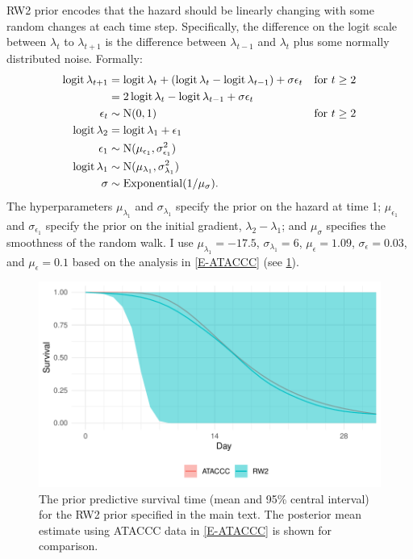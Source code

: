 \documentclass[thesis.tex]{subfiles}
\begin{document}
RW2 prior encodes that the hazard should be linearly changing with some random changes at each time step.
Specifically, the difference on the logit scale between $\lambda_t$ to $\lambda_{t+1}$ is the difference between $\lambda_{t-1}$ and $\lambda_t$ plus some normally distributed noise.
Formally:
\begin{align}
  \operatorname{logit}\lambda_{t+1}
  &= \operatorname{logit}\lambda_t + (\operatorname{logit}\lambda_t - \operatorname{logit}\lambda_{t-1}) + \sigma \epsilon_t &\text{for $t \geq 2$} \\
  &= 2\operatorname{logit}\lambda_t - \operatorname{logit}\lambda_{t-1} + \sigma \epsilon_t \\
  \epsilon_t &\sim \operatorname{N}(0, 1) &\text{for $t \geq 2$}  \\
  \operatorname{logit}\lambda_2 &= \operatorname{logit}\lambda_1 + \epsilon_1 \\\
  \epsilon_1 &\sim \operatorname{N}(\mu_{\epsilon_1}, \sigma_{\epsilon_1}^2) \\
  \operatorname{logit} \lambda_1 &\sim \operatorname{N}(\mu_{\lambda_1}, \sigma_{\lambda_1}^2) \\
  \sigma &\sim \operatorname{Exponential}(1/\mu_\sigma).
\end{align}
The hyperparameters $\mu_{\lambda_1}$ and $\sigma_{\lambda_1}$ specify the prior on the hazard at time 1; $\mu_{\epsilon_1}$ and $\sigma_{\epsilon_1}$ specify the prior on the initial gradient, $\lambda_2 - \lambda_1$; and $\mu_\sigma$ specifies the smoothness of the random walk.
I use $\mu_{\lambda_1} = -17.5$, $\sigma_{\lambda_1} = 6$, $\mu_\epsilon = 1.09$, $\sigma_\epsilon = 0.03$, and $\mu_\epsilon = 0.1$ based on the analysis in \cref{E-ATACCC} (see \cref{perf-test:fig:rw2-prior}).
\begin{figure}
  \centering \includegraphics{cis-perfect-testing/rw2-prior}
  \caption[RW2 prior for the hazard]{The prior predictive survival time (mean and 95\% central interval) for the RW2 prior specified in the main text. The posterior mean estimate using ATACCC data in \cref{E-ATACCC} is shown for comparison. \label{perf-test:fig:rw2-prior}}
\end{figure}
\end{document}
